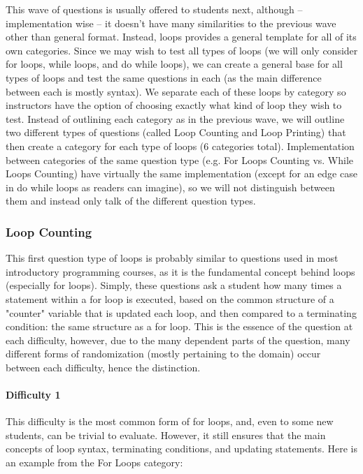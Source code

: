 \documentclass{article}
\begin{document}
This wave of questions is usually offered to students next, although -- implementation wise -- it doesn't have many similarities to the previous wave other than general format. Instead, loops provides 
a general template for all of its own categories. Since we may wish to test all types of loops (we will only consider for loops, while loops, and do while loops), we can create a general base for 
all types of loops and test the same questions in each (as the main difference between each is mostly syntax). We separate each of these loops by category so instructors have the option of 
choosing exactly what kind of loop they wish to test. Instead of outlining each category as in the previous wave, we will outline two different types of questions (called Loop Counting and Loop Printing) that then create a category for each type of loops (6 categories total). Implementation between categories of the same question type (e.g. For Loops Counting vs. While Loops Counting) have virtually the same implementation (except for an edge case in do while loops as readers can imagine), so we will not distinguish between them and instead only talk of the different question types.

\subsubsection{Loop Counting}

This first question type of loops is probably similar to questions used in most introductory programming courses, as it is the fundamental concept behind loops (especially for loops). Simply, these
questions ask a student how many times a statement within a for loop is executed, based on the common structure of a "counter" variable that is updated each loop, and then compared to a
terminating condition: the same structure as a for loop. This is the essence of the question at each difficulty, however, due to the many dependent parts of the question, many different forms 
of randomization (mostly pertaining to the domain) occur between each difficulty, hence the distinction.

\paragraph{Difficulty 1} \hfill \par
This difficulty is the most common form of for loops, and, even to some new students, can be trivial to evaluate. However, it still ensures that the main concepts of loop syntax, terminating 
conditions, and updating statements. Here is an example from the For Loops category:
\end{document}
